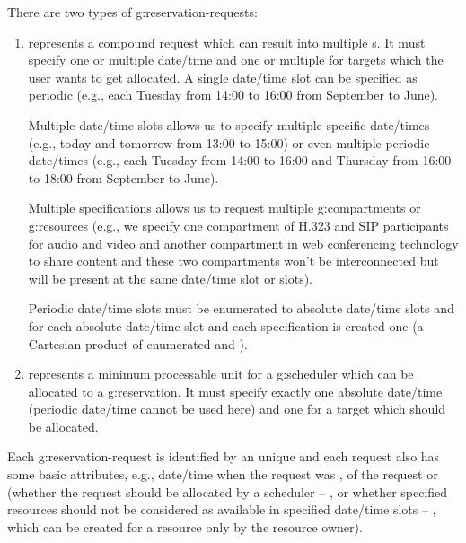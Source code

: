 There are two types of \glspl{g:reservation-request}:
\begin{enumerate}
\item {} represents a compound request which can result into multiple s. It must specify one or multiple date/time  and one or multiple  for targets which the user wants to get allocated. A single date/time slot can be specified as periodic (e.g., each Tuesday from 14:00 to 16:00 from September to June). 

Multiple date/time slots allows us to specify multiple specific date/times (e.g., today and tomorrow from 13:00 to 15:00) or even multiple periodic date/times (e.g., each Tuesday from 14:00 to 16:00 and Thursday from 16:00 to 18:00 from September to June).

Multiple specifications allows us to request multiple \glspl{g:compartment} or \glspl{g:resource} (e.g., we specify one compartment of H.323 and SIP participants for audio and video and another compartment in web conferencing technology to share content and these two compartments won't be interconnected but will be present at the same date/time slot or slots).

Periodic date/time slots must be enumerated to absolute date/time slots and for each absolute date/time slot and each specification is created one  (a Cartesian product of enumerated  and ).


\item {} represents a minimum processable unit for a \gls{g:scheduler} which can be allocated to a \gls{g:reservation}. It must specify exactly one absolute date/time  (periodic date/time cannot be used here) and one  for a target which should be allocated.
\end{enumerate}
Each \gls{g:reservation-request} is identified by an unique  and each request also has some basic attributes, e.g., date/time when the request was ,  of the request or  (whether the request should be allocated by a scheduler -- , or whether specified resources should not be considered as available in specified date/time slots -- , which can be created for a resource only by the resource owner).

